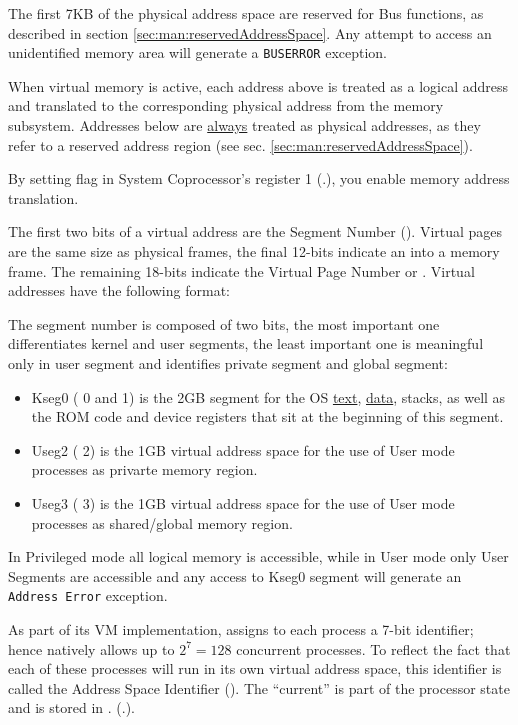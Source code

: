 The first 7KB of the physical address space are reserved for Bus functions, as described in section \ref{sec:man:reservedAddressSpace}. Any attempt to access an unidentified memory area will generate a \texttt{BUSERROR} exception.

\label{sec:man:virtualMemory}
When virtual memory is active, each address above  is treated as a logical address and translated to the corresponding physical address from the memory subsystem.
Addresses below  are \uline{always} treated as physical addresses, as they refer to a reserved address region (see sec. \ref{sec:man:reservedAddressSpace}).

By setting  flag in System Coprocessor's register 1 (.), you enable memory address translation.

The first two bits of a virtual address are the Segment Number ().
Virtual pages are the same size as physical frames, the final 12-bits indicate an  into a memory frame.
The remaining 18-bits indicate the Virtual Page Number or . 
Virtual addresses have the following format:


The segment number is composed of two bits, the most important one differentiates kernel and user segments, the least important one is meaningful only in user segment and identifies private segment and global segment:
\begin{itemize}
	\item Kseg0 ( 0 and 1) is the 2GB segment for the OS \uline{text}, \uline{data}, stacks, as well as the ROM code and device registers that sit at the beginning of this segment.
	\item Useg2 ( 2) is the 1GB virtual address space for the use of User mode processes as privarte memory region.
	\item Useg3 ( 3) is the 1GB virtual address space for the use of User mode processes as shared/global memory region.
\end{itemize}

In Privileged mode all logical memory is accessible, while in User mode only User Segments are accessible and any access to Kseg0 segment will generate an \texttt{Address Error} exception.


As part of its VM implementation, \uarm{} assigns to each process a 7-bit identifier; hence \uarm{} natively allows up to $2^7 = 128$ concurrent processes. To reflect the fact that each of these processes will run in its own virtual address space, this identifier is called the Address Space Identifier (). The “current”  is part of the processor state and is stored in . (.).

